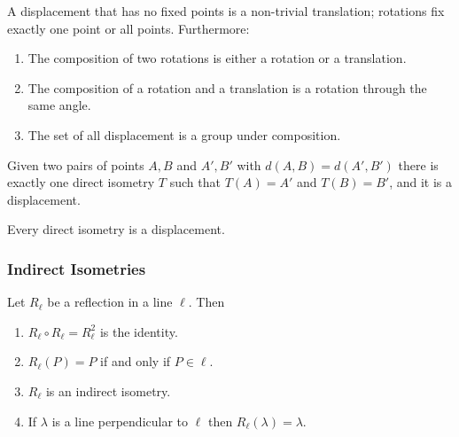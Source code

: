 
\begin{theorem}
    A displacement that has no fixed points is a non-trivial translation; rotations fix exactly one point or all points. Furthermore:
    \begin{enumerate}[label=\roman*)]
        \item The composition of two rotations is either a rotation or a translation.
        \item The composition of a rotation and a translation is a rotation through the same angle.
        \item The set of all displacement is a group under composition.
    \end{enumerate}
\end{theorem}

\begin{theorem}
    Given two pairs of points \(A, B\) and \(A', B'\) with \(d(A, B) = d(A', B')\) there is exactly one direct isometry \(T\) such that \(T(A) = A'\) and \(T(B) = B'\), and it is a displacement.
\end{theorem}

\begin{corollary}
    Every direct isometry is a displacement.
\end{corollary}

\subsubsection{Indirect Isometries}


\begin{theorem}
    Let \(R_\ell\) be a reflection in a line \(\ell\). Then
    \begin{enumerate}[label=\roman*)]
        \item \(R_\ell \circ R_\ell = R_\ell^2\) is the identity.
        \item \(R_\ell(P) = P\) if and only if \(P \in \ell\).
        \item \(R_\ell\) is an indirect isometry.
        \item If \(\lambda\) is a line perpendicular to \(\ell\) then \(R_\ell(\lambda) = \lambda\).
    \end{enumerate}
\end{theorem}

